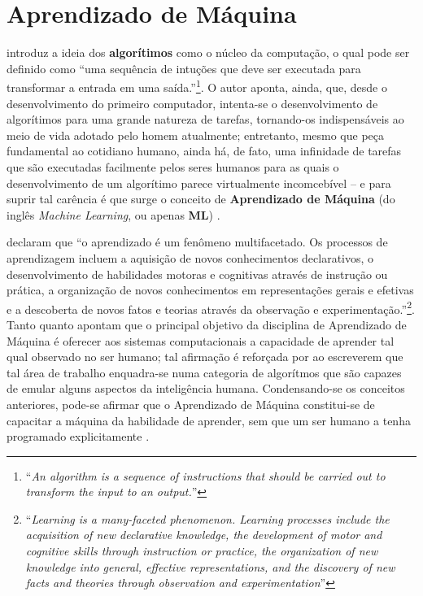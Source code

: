 \section{Aprendizado de Máquina}
\label{sec:ml}

 introduz a ideia dos \textbf{algorítimos} como o núcleo da computação, o qual pode ser definido como ``uma sequência de intuções que deve ser executada para transformar a entrada em uma saída.''\footnote{``\textit{An algorithm is a sequence of instructions that should be carried out to transform the input to an output.}''}. O autor aponta, ainda, que, desde o desenvolvimento do primeiro computador, intenta-se o desenvolvimento de algorítimos para uma grande natureza de tarefas, tornando-os indispensáveis ao meio de vida adotado pelo homem atualmente; entretanto, mesmo que peça fundamental ao cotidiano humano, ainda há, de fato, uma infinidade de tarefas que são executadas facilmente pelos seres humanos para as quais o desenvolvimento de um algorítimo parece virtualmente incomcebível -- e para suprir tal carência é que surge o conceito de \textbf{Aprendizado de Máquina } (do inglês \textit{Machine Learning}, ou apenas \textbf{ML}) \cite{alpaydin2020introduction}.

 declaram que ``o aprendizado é um fenômeno multifacetado. Os processos de aprendizagem incluem a aquisição de novos conhecimentos declarativos, o desenvolvimento de habilidades motoras e cognitivas através de instrução ou prática, a organização de novos conhecimentos em representações gerais e efetivas e a descoberta de novos fatos e teorias através da observação e experimentação.''\footnote{``\textit{Learning is a many-faceted phenomenon. Learning processes include the acquisition of new declarative knowledge, the development of motor and cognitive skills through instruction or practice, the organization of new knowledge into general, effective representations, and the discovery of new facts and theories through observation and experimentation}''}. Tanto  quanto  apontam que o principal objetivo da disciplina de Aprendizado de Máquina é oferecer aos sistemas computacionais a capacidade de aprender tal qual observado no ser humano; tal afirmação é reforçada por  ao escreverem que tal área de trabalho enquadra-se numa categoria de algorítmos que são capazes de emular alguns aspectos da inteligência humana. Condensando-se os conceitos anteriores, pode-se afirmar que o Aprendizado de Máquina constitui-se de capacitar a máquina da habilidade de aprender, sem que um ser humano a tenha programado explicitamente \cite{samuel1988some}.
